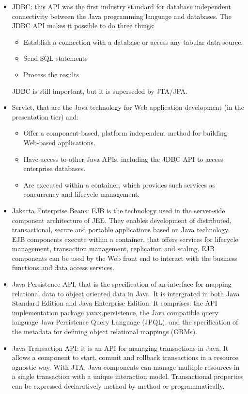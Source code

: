 \documentclass[12pt, a4paper]{report}
\newtheorem[style=M,bodystyle=\normalfont]{theorem}{Theorem}
\newtheorem[style=M,bodystyle=\normalfont]{corollary}{Corollary}
\newtheorem[style=M,bodystyle=\normalfont]{lemma}{Lemma}
\newtheorem[style=M,bodystyle=\normalfont]{definition}{Definition}
\begin{document}
    \begin{itemize}
        \item JDBC: this API was the first industry standard for database independent connectivity between the Java programming language and databases. The JDBC API makes it possible to do three things:
            \begin{itemize}
                \item Establish a connection with a database or access any tabular data source. 
                \item Send SQL statements
                \item Process the results
            \end{itemize}
            JDBC is still important, but it is superseded by JTA/JPA. 
        \item Servlet, that are the Java technology for Web application development (in the presentation tier) and:
            \begin{itemize}
                \item Offer a component-based, platform independent method for building Web-based applications. 
                \item Have access to other Java APIs, including the JDBC API to access enterprise databases. 
                \item Are executed within a container, which provides such services as concurrency and lifecycle management. 
            \end{itemize}
        \item Jakarta Enterprise Beans: EJB is the technology used in  the server-side component architecture of JEE. They enables development of distributed, transactional, secure and portable applications based 
            on Java technology. EJB components execute within a container, that offers services for lifecycle management, transaction management, replication and scaling. EJB components can be used by the Web front
            end to interact with the business functions and data access services. 
        \item Java Persistence API, that is the specification of an interface for mapping relational data to object oriented data in Java. It is intergrated in both Java Standard Edition and Java Enterprise Edition. 
            It comprises: the API implementation package javax.persistence, the Java compatible query language Java Persistence Query Language (JPQL), and the specification of the metadata for defining object
            relational mappings (ORMs). 
        \item Java Transaction API: it is an API for managing transactions in Java. It allows a component to start, commit and rollback transactions in a resource agnostic way. With JTA, Java components can manage 
            multiple resources in a single transaction with a unique interaction model. Transactional properties can be expressed declaratively method by method or programmatically. 
    \end{itemize}
\end{document}
